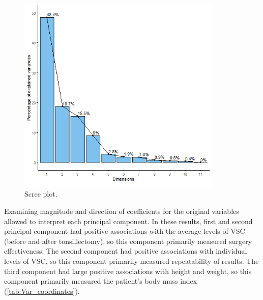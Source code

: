 \documentclass[12pt,a4paper,notitlepage]{report}
\begin{document}
\begin{figure}[hbt!]
	\centering
	\includegraphics[width=0.87\textwidth]{./Figures/Fig_3.2}
	\caption{Scree plot.}
	\label{fig:Fig_3.2}
\end{figure}	

Examining magnitude and direction of coefficients for the original variables allowed to interpret each principal component. In these results, first and second principal component had positive associations with the average levels of VSC (before and after tonsillectomy), so this component primarily measured surgery effectiveness. The second component had positive associations with individual levels of VSC, so this component primarily measured repeatability of results. The third component had large positive associations with height and weight, so this component primarily measured the patient's body mass index (\ref{tab:Var_coordinates}). 
\end{document}
